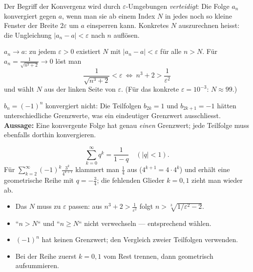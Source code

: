 


Der Begriff der Konvergenz wird durch $\varepsilon$-Umgebungen
\emph{verteidigt}: Die Folge $a_n$ konvergiert gegen $a$, wenn man sie ab
einem Index $N$ in jedes noch so kleine Fenster der Breite $2\varepsilon$
um $a$ einsperren kann. Konkretes $N$ auszurechnen heisst: die Ungleichung
$|a_n-a|<\varepsilon$ nach $n$ aufl\"osen.

\begin{werkzeugkasten}
$a_n\to a$: zu jedem $\varepsilon>0$ existiert $N$ mit $|a_n-a|<\varepsilon$
f\"ur alle $n>N$. F\"ur $a_n=\frac1{\sqrt{n^3+2}}\to0$ l\"ost man
\begin{equation}
  \frac1{\sqrt{n^3+2}}<\varepsilon\ \Longleftrightarrow\ n^3+2>\frac1{\varepsilon^2}
\end{equation}
und w\"ahlt $N$ aus der linken Seite von $\varepsilon$. (F\"ur das
konkrete $\varepsilon=10^{-3}$: $N\approx99$.)
\end{werkzeugkasten}

\begin{werkzeugkasten}
$b_n=(-1)^n$ konvergiert nicht: Die Teilfolgen $b_{2k}=1$ und
$b_{2k+1}=-1$ hätten unterschiedliche Grenzwerte, was ein eindeutiger
Grenzwert ausschliesst. \textbf{Aussage:} Eine konvergente Folge hat
genau \emph{einen} Grenzwert; jede Teilfolge muss ebenfalls dorthin
konvergieren.
\end{werkzeugkasten}

\begin{werkzeugkasten}
\begin{equation}
  \sum_{k=0}^{\infty}q^k=\frac1{1-q}\quad(|q|<1).
\end{equation}
F\"ur $\sum_{k=2}^{\infty}(-1)^k\frac{3^k}{4^{k+1}}$ klammert man
$\frac14$ aus ($4^{k+1}=4\cdot4^k$) und erh\"alt eine geometrische Reihe
mit $q=-\frac34$; die fehlenden Glieder $k=0,1$ zieht man wieder ab.
\end{werkzeugkasten}

\begin{achtung}
\begin{itemize}
  \item Das $N$ muss zu $\varepsilon$ passen: aus
        $n^3+2>\frac1{\varepsilon^2}$ folgt $n>\sqrt[3]{1/\varepsilon^2-2}$.
  \item ``$n>N$`` und ``$n\ge N$`` nicht verwechseln --- entsprechend
        w\"ahlen.
  \item $(-1)^n$ hat keinen Grenzwert; den Vergleich zweier Teilfolgen
        verwenden.
  \item Bei der Reihe zuerst $k=0,1$ vom Rest trennen, dann geometrisch
        aufsummieren.
\end{itemize}
\end{achtung}

